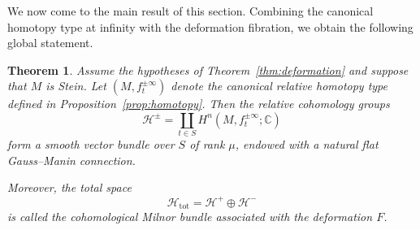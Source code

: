 \documentclass[11pt]{amsart}
\theoremstyle{plain}
\newtheorem{theorem}{Theorem}[section]
\theoremstyle{definition}
\theoremstyle{remark}
\numberwithin{equation}{section}
\begin{document}
We now come to the main result of this section.
Combining the canonical homotopy type at infinity with the deformation fibration, we obtain the following global statement.

\begin{theorem}\label{thm:bundle}
    Assume the hypotheses of Theorem~\ref{thm:deformation} and suppose that $M$ is Stein.
    Let $(M, f_t^{\pm\infty})$ denote the canonical relative homotopy type defined in Proposition~\ref{prop:homotopy}.
    Then the relative cohomology groups
    \begin{equation}
        \mathcal{H}^{\pm} = \coprod_{t\in S} H^n(M, f_t^{\pm\infty}; \mathbb{C})
    \end{equation}
    form a smooth vector bundle over $S$ of rank $\mu$, endowed with a natural flat Gauss--Manin connection.

    Moreover, the total space
    \begin{equation}
        \mathcal{H}_{\mathrm{tot}} = \mathcal{H}^{+} \oplus \mathcal{H}^{-}
    \end{equation}
    is called the cohomological Milnor bundle associated with the deformation $F$.
\end{theorem}
\end{document}
